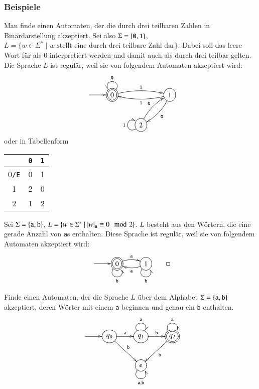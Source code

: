 \subsubsection{Beispiele}
\begin{beispiel} 
Man finde einen Automaten, der die durch drei teilbaren Zahlen in
Binärdarstellung akzeptiert.
Sei also $\Sigma=\{{\tt 0},{\tt 1}\}$,
$L=\{w\in\Sigma^*\;|\; \text{$w$ stellt eine durch drei teilbare Zahl dar}\}.$
Dabei soll das leere Wort für als $0$
interpretiert werden und damit auch als durch drei teilbar gelten.
Die Sprache $L$ ist regulär, weil sie
von folgendem Automaten akzeptiert wird:
\[
\entrymodifiers={++[o][F]}
\xymatrix{
*+\txt{} \ar[r]
	&*++[o][F=]{0} \ar@/^/[rr]^{\tt 1} \ar@(ur,ul)_{\tt 0}
		&*+\txt{}
			&{1} \ar@/^/[dl]^{\tt 0}  \ar@/^/[ll]^{\tt 1}
\\
*+\txt{}
	&*+\txt{}
		&2\ar@/^/[ur]^{\tt 0} \ar@(dl,ul)^{\tt 1}
}
\]
oder in Tabellenform
\begin{center}
\begin{tabular}{|c|cc|}
\hline
&\tt 0&\tt 1\\
\hline
0{\tt /E}&0&1\\
1        &2&0\\
2        &1&2\\
\hline
\end{tabular}
\end{center}
\end{beispiel}

\begin{beispiel}
Sei $\Sigma=\{{\tt a},{\tt b}\}$,
$L=\{w\in\Sigma^*\;|\; |w|_{\tt a}\equiv 0\mod 2\}$.
$L$ besteht aus den Wörtern, die  eine gerade Anzahl von {\tt a}s enthalten.
Diese Sprache ist regulär, weil sie von folgendem Automaten akzeptiert wird:
\[
\entrymodifiers={++[o][F]}
\xymatrix{
*+\txt{} \ar[r]
	&*++[o][F=]{0}\ar@/^/[r]^{\tt a} \ar@(dl,dr)_{\tt b}
		&1 \ar@/^/[l]^{\tt a} \ar@(dl,dr)_{\tt b}
}
\qedhere
\]
\end{beispiel}

\begin{beispiel}
Finde einen Automaten, der die Sprache $L$ über dem Alphabet
$\Sigma=\{{\tt a},{\tt b}\}$ akzeptiert, deren Wörter mit 
einem {\tt a} beginnen und genau ein {\tt b} enthalten.
\[
\entrymodifiers={++[o][F]}
\xymatrix{
*+\txt{} \ar[r]
	&{q_0} \ar[r]^{\tt a} \ar[dr]^{\tt b}
		&{q_1} \ar@(ul,ur)^{\tt a} \ar[r]^{\tt b}
			&*++[o][F=]{q_2}\ar@(ul,ur)^{\tt a}  \ar[dl]^{\tt b}
\\
*+\txt{}
	&*+\txt{}
		&{e}\ar@(dl,dr)_{{\tt a},{\tt b}}
}
\]
\end{beispiel}

